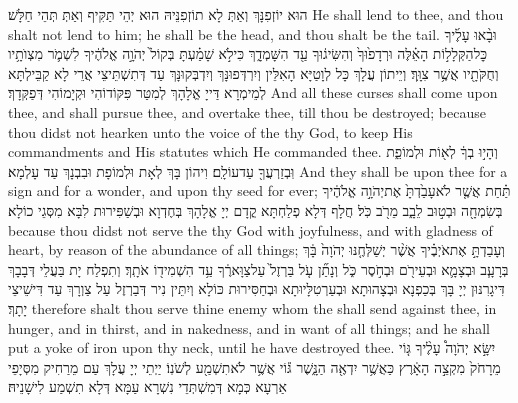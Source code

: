 {הוּא יוֹזְפִנָּךְ וְאַתְּ לָא תוֹזְפִנֵּיהּ הוּא יְהֵי תַּקִּיף וְאַתְּ תְּהֵי חַלָּשׁ׃}
{He shall lend to thee, and thou shalt not lend to him; he shall be the head, and thou shalt be the tail.}{}
{וּבָ֨אוּ עָלֶ֜יךָ כׇּל\maqqaf הַקְּלָל֣וֹת הָאֵ֗לֶּה וּרְדָפ֙וּךָ֙ וְהִשִּׂיג֔וּךָ עַ֖ד הִשָּׁמְדָ֑ךְ כִּי\maqqaf לֹ֣א שָׁמַ֗עְתָּ בְּקוֹל֙ יְהֹוָ֣ה אֱלֹהֶ֔יךָ לִשְׁמֹ֛ר מִצְוֺתָ֥יו וְחֻקֹּתָ֖יו אֲשֶׁ֥ר צִוָּֽךְ׃}
{וְיֵיתוֹן עֲלָךְ כָּל לְוָטַיָּא הָאִלֵּין וְיִרְדְּפוּנָּךְ וְיִדְבְּקוּנָּךְ עַד דְּתִשְׁתֵּיצֵי אֲרֵי לָא קַבֵּילְתָּא לְמֵימְרָא דַּייָ אֱלָהָךְ לְמִטַּר פִּקּוֹדוֹהִי וּקְיָמוֹהִי דְּפַקְּדָךְ׃}
{And all these curses shall come upon thee, and shall pursue thee, and overtake thee, till thou be destroyed; because thou didst not hearken unto the voice of the \lord\space thy God, to keep His commandments and His statutes which He commanded thee.}{}
{וְהָי֣וּ בְךָ֔ לְא֖וֹת וּלְמוֹפֵ֑ת וּֽבְזַרְעֲךָ֖ עַד\maqqaf עוֹלָֽם׃}
{וִיהוֹן בָּךְ לְאָת וּלְמוֹפָת וּבִבְנָךְ עַד עָלְמָא׃}
{And they shall be upon thee for a sign and for a wonder, and upon thy seed for ever;}{}
{תַּ֗חַת אֲשֶׁ֤ר לֹא\maqqaf עָבַ֙דְתָּ֙ אֶת\maqqaf יְהֹוָ֣ה אֱלֹהֶ֔יךָ בְּשִׂמְחָ֖ה וּבְט֣וּב לֵבָ֑ב מֵרֹ֖ב כֹּֽל׃}
{חֲלָף דְּלָא פְלַחְתָּא קֳדָם יְיָ אֱלָהָךְ בְּחֶדְוָא וּבְשַׁפִּירוּת לִבָּא מִסְּגֵי כוֹלָא׃}
{because thou didst not serve the \lord\space thy God with joyfulness, and with gladness of heart, by reason of the abundance of all things;}{}
{וְעָבַדְתָּ֣ אֶת\maqqaf אֹיְבֶ֗יךָ אֲשֶׁ֨ר יְשַׁלְּחֶ֤נּוּ יְהֹוָה֙ בָּ֔ךְ בְּרָעָ֧ב וּבְצָמָ֛א וּבְעֵירֹ֖ם וּבְחֹ֣סֶר כֹּ֑ל וְנָתַ֞ן עֹ֤ל בַּרְזֶל֙ עַל\maqqaf צַוָּארֶ֔ךָ עַ֥ד הִשְׁמִיד֖וֹ אֹתָֽךְ׃}
{וְתִפְלַח יָת בַּעֲלֵי דְּבָבָךְ דִּיגָרִנּוּן יְיָ בָּךְ בְּכַפְנָא וּבְצָהוּתָא וּבְעַרְטִלָּיוּתָא וּבְחַסִּירוּת כּוֹלָא וְיִתֵּין נִיר דְּבַרְזֶל עַל צַוְרָךְ עַד דִּישֵׁיצֵי יָתָךְ׃}
{therefore shalt thou serve thine enemy whom the \lord\space shall send against thee, in hunger, and in thirst, and in nakedness, and in want of all things; and he shall put a yoke of iron upon thy neck, until he have destroyed thee.}{}
{יִשָּׂ֣א יְהֹוָה֩ עָלֶ֨יךָ גּ֤וֹי מֵרָחֹק֙ מִקְצֵ֣ה הָאָ֔רֶץ כַּאֲשֶׁ֥ר יִדְאֶ֖ה הַנָּ֑שֶׁר גּ֕וֹי אֲשֶׁ֥ר לֹא\maqqaf תִשְׁמַ֖ע לְשֹׁנֽוֹ׃}
{יַיְתֵי יְיָ עֲלָךְ עַם מֵרַחִיק מִסְּיָפֵי אַרְעָא כְּמָא דְּמִשְׁתְּדֵי נִשְׁרָא עַמָּא דְּלָא תִשְׁמַע לִישָׁנֵיהּ׃}
